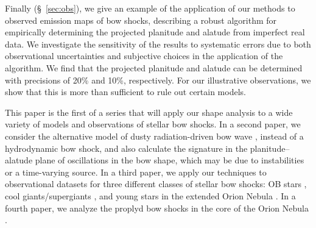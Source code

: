 Finally (\S~\ref{sec:obs}), we give an example of the application of
our methods to observed emission maps of bow shocks, describing a
robust algorithm for empirically determining the projected planitude
and alatude from imperfect real data.  We investigate the sensitivity
of the results to systematic errors due to both observational
uncertainties and subjective choices in the application of the
algorithm.  We find that the projected planitude and alatude can be
determined with precisions of 20\% and 10\%, respectively.  For our
illustrative observations, we show that this is more than sufficient
to rule out certain models.

This paper is the first of a series that will apply our shape analysis
to a wide variety of models and observations of stellar bow shocks.
In a second paper, %
we consider the alternative model of dusty radiation-driven bow wave
\citep{Ochsendorf:2014a}, instead of a hydrodynamic bow shock, and
also calculate the signature in the planitude--alatude plane of
oscillations in the bow shape, which may be due to instabilities or a
time-varying source.  In a third paper, %
we apply our techniques to observational datasets for three different
classes of stellar bow shocks: OB stars \citep{Kobulnicky:2016a}, cool
giants/supergiants \citep{Cox:2012a}, and young stars in the extended
Orion Nebula \citep{Henney:2013a}.  In a fourth paper,
we analyze the proplyd bow shocks in the core of the Orion Nebula
\citep{Garcia-Arredondo:2001a}.



